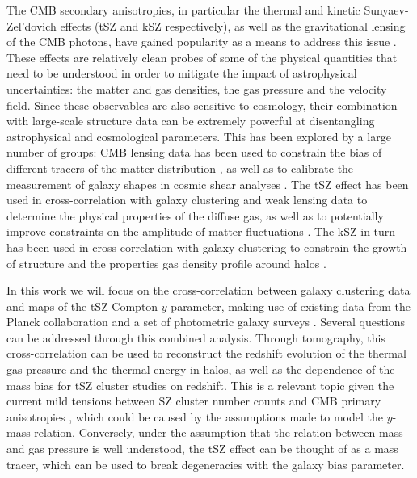\documentclass[useAMS,usenatbib]{mn2e}
\begin{document}
  The CMB secondary anisotropies, in particular the thermal and kinetic Sunyaev-Zel'dovich effects (tSZ and kSZ respectively), as well as the gravitational lensing of the CMB photons, have gained popularity as a means to address this issue \citep{2017JCAP...11..040B,2019BAAS...51c.297B}. These effects are relatively clean probes of some of the physical quantities that need to be understood in order to mitigate the impact of astrophysical uncertainties: the matter and gas densities, the gas pressure and the velocity field. Since these observables are also sensitive to cosmology, their combination with large-scale structure data can be extremely powerful at disentangling astrophysical and cosmological parameters. This has been explored by a large number of groups: CMB lensing data has been used to constrain the bias of different tracers of the matter distribution \citep[e.g.][]{2019MNRAS.485.1720H,2018JCAP...04..053A,2018arXiv181002322A,2018MNRAS.481.1133P}, as well as to calibrate the measurement of galaxy shapes in cosmic shear analyses \citep{2017PhRvD..95l3512S}. The tSZ effect has been used in cross-correlation with galaxy clustering and weak lensing data to determine the physical properties of the diffuse gas, as well as to potentially improve constraints on the amplitude of matter fluctuations \citep{2014PhRvD..89b3508V,2014JCAP...02..030H,2015JCAP...09..046M,2017MNRAS.471.1565H,2017ApJ...845...71A,2018PhRvD..97f3514A,2018MNRAS.480.3928M,2019A&A...624A..48D,2019MNRAS.483..223T,2019arXiv190306654T,2019arXiv190413347P,2019arXiv190707870M}. The kSZ in turn has been used in cross-correlation with galaxy clustering to constrain the growth of structure and the properties gas density profile around halos \citep{2016PhRvD..93h2002S,2016A&A...586A.140P,2016PhRvL.117e1301H,2016MNRAS.461.3172S,2017JCAP...03..008D}.
  
  In this work we will focus on the cross-correlation between galaxy clustering data and maps of the tSZ Compton-$y$ parameter, making use of existing data from the Planck collaboration \citep{2016A&A...594A..22P} and a set of photometric galaxy surveys \citep{2014ApJS..210....9B,2016ApJS..225....5B}. Several questions can be addressed through this combined analysis. Through tomography, this cross-correlation can be used to reconstruct the redshift evolution of the thermal gas pressure and the thermal energy in halos, as well as the dependence of the mass bias for tSZ cluster studies on redshift. This is a relevant topic given the current mild tensions between SZ cluster number counts and CMB primary anisotropies \citep{2016A&A...594A..24P,2016ApJ...832...95D,2019ApJ...878...55B,2019arXiv190407887Z}, which could be caused by the assumptions made to model the $y$-mass relation. Conversely, under the assumption that the relation between mass and gas pressure is well understood, the tSZ effect can be thought of as a mass tracer, which can be used to break degeneracies with the galaxy bias parameter.
\end{document}
